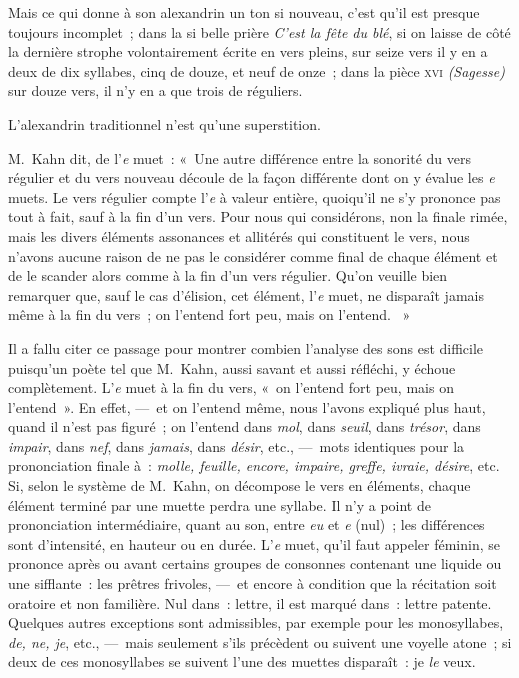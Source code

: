 \documentclass[french,twoside]{book} %
\begin{document}
\noindent Mais ce qui donne à son alexandrin un ton si nouveau, c’est qu’il est presque toujours incomplet ; dans la si belle prière {\itshape C’est la fête du blé}, si on laisse de côté la dernière strophe volontairement écrite en vers pleins, sur seize vers il y en a deux de dix syllabes, cinq de douze, et neuf de onze ; dans la pièce \textsc{xvi} {\itshape (Sagesse)} sur douze vers, il n’y en a que trois de réguliers.\par
L’alexandrin traditionnel n’est qu’une superstition.\par
M. Kahn dit, de l’{\itshape e} muet : « Une autre différence entre la sonorité du vers régulier et du vers nouveau découle de la façon différente dont on y évalue les {\itshape e} muets. Le vers régulier compte l’{\itshape e} à valeur entière, quoiqu’il ne s’y prononce pas tout à fait, sauf à la fin d’un vers. Pour nous qui considérons, non la finale rimée, mais les divers éléments assonances et allitérés qui constituent le vers, nous n’avons aucune raison de ne pas le considérer comme final de chaque élément et de le scander alors comme à la fin d’un vers régulier. Qu’on veuille bien remarquer que, sauf le cas d’élision, cet élément, l’{\itshape e} muet, ne disparaît jamais même à la fin du vers ; on l’entend fort peu, mais on l’entend.  »\par
Il a fallu citer ce passage pour montrer combien l’analyse des sons est difficile puisqu’un poète tel que M. Kahn, aussi savant et aussi réfléchi, y échoue complètement. L’{\itshape e} muet à la fin du vers, « on l’entend fort peu, mais on l’entend ». En effet, — et on l’entend même, nous l’avons expliqué plus haut, quand il n’est pas figuré ; on l’entend dans {\itshape mol}, dans {\itshape seuil}, dans {\itshape trésor}, dans {\itshape impair}, dans {\itshape nef}, dans {\itshape jamais}, dans {\itshape désir}, etc., — mots identiques pour la prononciation finale à : {\itshape molle, feuille, encore, impaire, greffe, ivraie, désire}, etc. Si, selon le système de M. Kahn, on décompose le vers en éléments, chaque élément terminé par une muette perdra une syllabe. Il n’y a point de prononciation intermédiaire, quant au son, entre {\itshape eu} et {\itshape e} (nul) ; les différences sont d’intensité, en hauteur ou en durée. L’{\itshape e} muet, qu’il faut appeler féminin, se prononce après ou avant certains groupes de consonnes contenant une liquide ou une sifflante : les prêtres frivoles, — et encore à condition que la récitation soit oratoire et non familière. Nul dans : lettre, il est marqué dans : lettre patente. Quelques autres exceptions sont admissibles, par exemple pour les monosyllabes, {\itshape de, ne, je}, etc., — mais seulement s’ils précèdent ou suivent une voyelle atone ; si deux de ces monosyllabes se suivent l’une des muettes disparaît : je {\itshape le} veux.\par
\end{document}
